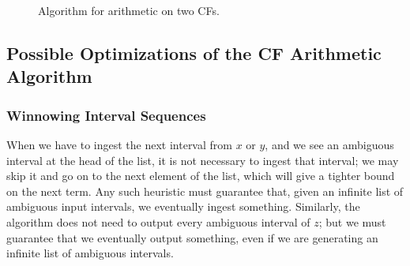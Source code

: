 \documentclass[11pt, oneside]{amsart}   	%
\begin{document}
\begin{figure}
\begin{algorithmic}\label{fig:twoCFarith}
\STATE{}
\STATE{}
\STATE{}
 
 
 
    \STATE{}
     \ELSE
         \STATE{$I_x \gets [1,\infty)$}
     \ENDIF
     \ELSE
         \STATE{$I_y \gets [1,\infty)$}
     \ENDIF
     
     \STATE{}
     \ELSE
     \ENDIF
\ENDWHILE
\end{algorithmic}
\caption{Algorithm for arithmetic on two CFs.}
\end{figure}


\subsection{Possible Optimizations of the CF Arithmetic Algorithm}
\subsubsection{Winnowing Interval Sequences}
When we have to ingest the next interval from $x$ or $y$, and we see an ambiguous interval at the head of the list, it is not necessary to ingest that interval; we may skip it and go on to the next element of the list, which will give a tighter bound on the next term. Any such heuristic must guarantee that, given an infinite list of ambiguous input intervals, we eventually ingest something. Similarly, the algorithm does not need to output every ambiguous interval of $z$; but  we must guarantee that we eventually output something, even if we are generating an infinite list of ambiguous intervals.
\end{document}
